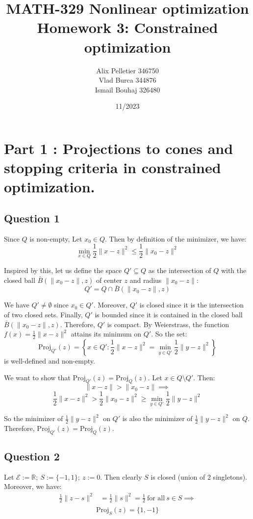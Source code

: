 \documentclass[12p]{article}
\title{MATH-329 Nonlinear optimization
Homework 3: Constrained optimization}
\author{Alix Pelletier 346750 \\ Vlad Burca 344876 \\ Ismail Bouhaj 326480}
\date{11/2023}
\newcommand*{\proj}{\text{Proj}}
\newcommand*{\es}{\mathcal{E}}
\begin{document}
\maketitle 
\section*{Part 1 : Projections to cones and stopping criteria in constrained optimization.}
\subsection*{Question 1} \hfil\par
Since \(Q\) is non-empty, Let \(x_0\in Q\). Then by definition of the minimizer, we have:
\[
  \min_{x\in Q} \frac{1}{2}\|x-z\|^2 \leq \frac{1}{2}\|x_0-z\|^2
\]

Inspired by this, let us define the space \(Q'\subseteq Q\) as the intersection of \(Q\) with the closed ball \(\bar B(\|x_0-z\|,z)\) of center \(z\) and radius \(\|x_0-z\|\):
\[
    Q'=Q\cap \bar B(\|x_0-z\|,z)  
\]

We have \(Q'\neq \emptyset\) since \(x_0\in Q'\). Moreover, \(Q'\) is closed since it is the intersection of two closed sets. Finally, \(Q'\) is bounded since it is contained in the closed ball \(\bar B(\|x_0-z\|,z)\). Therefore, \(Q'\) is compact. By Weierstrass, the function \(f(x)=\frac{1}{2}\|x-z\|^2\) attains its minimum on \(Q'\). So the set:
\[
    \proj_{Q'}(z)=\left\{x\in Q': \frac{1}{2}\|x-z\|^2=\min_{y\in Q'}\frac{1}{2}\|y-z\|^2\right\}    
\]
is well-defined and non-empty.

We want to show that \(\proj_{Q'}(z)=\proj_Q(z) \). Let \(x\in Q\setminus Q'\). Then:
\[
    \|x-z\|>\|x_0-z\|\implies 
\]
\[
    \frac{1}{2}\|x-z\|^2>\frac{1}{2}\|x_0-z\|^2\geq \min_{y\in Q'}\frac{1}{2}\|y-z\|^2
\]

So the minimizer of \(\frac{1}{2}\|y-z\|^2 \) on \(Q'\) is also the minimizer of \(\frac{1}{2}\|y-z\|^2\) on \(Q\). Therefore, \(\proj_{Q'}(z)=\proj_Q(z) \).

\subsection*{Question 2} 
Let \(\es:=\mathbb{R};\ S:=\{-1,1\};\ z:=0\). Then clearly \(S\) is closed (union of 2 singletons). Moreover, we have:
\begin{align*}
    \frac{1}{2}\|z-s\|^2&=\frac{1}{2}\|s\|^2=\frac{1}{2}\ \text{for all}\ s\in S \implies \\
\end{align*}
\[
    \proj_S(z)=\{1,-1\} 
\]
\end{document}
